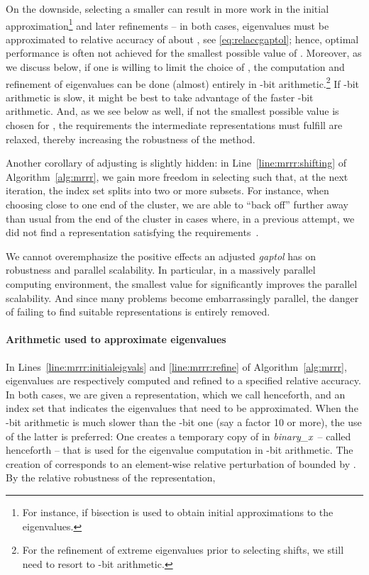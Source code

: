 \documentclass[final]{siamltex}
\newcommand{\binaryx}{{\it binary\_\hspace*{1pt}x}}
\begin{document}
On the downside, selecting a smaller  can result in more work in the
initial approximation\footnote{For instance, if bisection is used to obtain
  initial approximations to the eigenvalues.} and later refinements -- in
both cases, eigenvalues must be approximated to relative accuracy of about , see
\eqref{eq:relaccgaptol}; hence, optimal performance is often not achieved
for the smallest possible value of . 
Moreover, as we discuss below, if one is willing to limit
the choice of , the computation and refinement of eigenvalues can be
done (almost) entirely in -bit arithmetic.\footnote{For the refinement of extreme
  eigenvalues prior to selecting shifts, we still need to resort to
  -bit arithmetic.} If -bit arithmetic is slow, it might be best to
take advantage of the faster -bit arithmetic. And, as we see below as
well, if not the smallest possible value is chosen for , the
requirements the intermediate 
representations must fulfill are relaxed, thereby increasing the robustness
of the method.  

Another corollary of adjusting  is slightly hidden: in
Line~\ref{line:mrrr:shifting} of Algorithm~\ref{alg:mrrr}, we gain more freedom
in selecting  such
that, at the next iteration, the index set 
 splits into two or more subsets. For instance, when choosing
 close to one end of the cluster, we are able to ``back off'' further
away than usual from the end of the cluster in cases where, in a previous
attempt, we did not find a representation satisfying the requirements~\cite{DesignMRRR}. 

We cannot overemphasize the positive effects an adjusted {\em gaptol} has on
robustness and parallel scalability. In particular, in a massively parallel
computing environment, the smallest value for  significantly
improves the parallel scalability. And since many problems become embarrassingly
parallel, the danger of failing to find suitable representations is entirely
removed. 


\paragraph{Arithmetic used to approximate eigenvalues} 
In Lines~\ref{line:mrrr:initialeigvals} and \ref{line:mrrr:refine} of
Algorithm~\ref{alg:mrrr}, eigenvalues are respectively computed and refined
to a specified relative accuracy. 
In both cases, we are given a
representation, which we call  henceforth, and an index set
 that indicates the eigenvalues that need to be approximated. 
When the -bit arithmetic is much slower than the -bit one (say a
factor 10 or more), the use of the latter is preferred: 
One creates a temporary copy of  in \binaryx\ -- called  henceforth
-- that is used for the eigenvalue computation in -bit arithmetic. The creation of 
corresponds to an element-wise relative perturbation of  bounded by
. By the relative robustness of the representation, 
\end{document}
